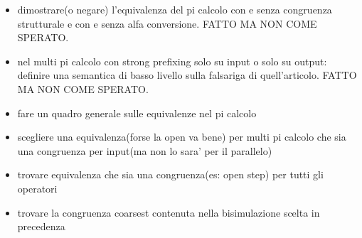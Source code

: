 




\begin{itemize}
  \item
    dimostrare(o negare) l'equivalenza del pi calcolo con e senza congruenza strutturale e con e senza alfa conversione. FATTO MA NON COME SPERATO.
  \item
    nel multi pi calcolo con strong prefixing solo su input o solo su output: definire una semantica di basso livello sulla falsariga di quell'articolo. FATTO MA NON COME SPERATO.
  \item
    fare un quadro generale sulle equivalenze nel pi calcolo
  \item
    scegliere una equivalenza(forse la open va bene) per multi pi calcolo che sia una congruenza per input(ma non lo sara' per il parallelo)
  \item
    trovare equivalenza che sia una congruenza(es: open step) per tutti gli operatori
  \item
    trovare la congruenza coarsest contenuta nella bisimulazione scelta in precedenza
\end{itemize}



